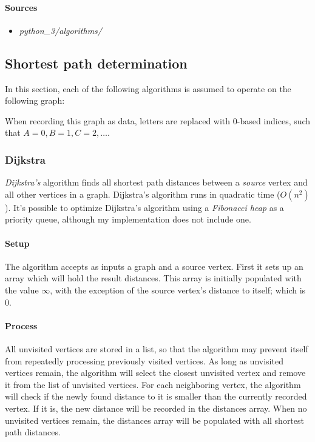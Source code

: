 \documentclass{article}
\begin{document}
\begin{samepage}
  \paragraph{Sources}
  \begin{itemize}
  \item{{\em python\_3/algorithms/}}
  \end{itemize}
\end{samepage}


\newpage


\subsection{Shortest path determination}
In this section, each of the following algorithms is assumed to operate on the following graph:


When recording this graph as data, letters are replaced with 0-based indices, such that \(A=0, B=1, C=2, \dots\).

\subsubsection{Dijkstra}
{\em Dijkstra's} algorithm finds all shortest path distances between a {\em source} vertex and all other vertices
in a graph. Dijkstra's algorithm runs in quadratic time (\(O(n^2)\)). It's possible to optimize Dijkstra's algorithm
using a {\em Fibonacci heap} as a priority queue, although my implementation does not include one.

\paragraph{Setup}
The algorithm accepts as inputs a graph and a source vertex. First it sets up an array which will hold the result
distances. This array is initially populated with the value \(\infty\), with the exception of the source vertex's
distance to itself; which is 0.

\paragraph{Process}
All unvisited vertices are stored in a list, so that the algorithm may prevent itself from repeatedly
processing previously visited vertices. As long as unvisited vertices remain, the algorithm will select the closest
unvisited vertex and remove it from the list of unvisited vertices. For each neighboring vertex, the algorithm will
check if the newly found distance to it is smaller than the currently recorded vertex. If it is, the new distance
will be recorded in the distances array. When no unvisited vertices remain, the distances array will be populated
with all shortest path distances.
\end{document}
